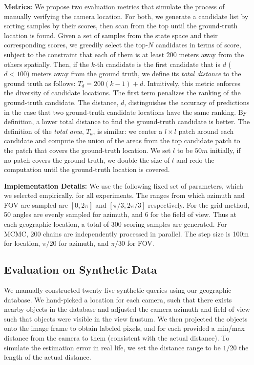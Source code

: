 \noindent
\textbf{Metrics:}
We propose two evaluation metrics that simulate the process of
manually verifying the camera location. For both, we generate a
candidate list by sorting samples by their scores, then scan from the
top until the ground-truth location is found.
Given a set of samples from the state space and
their corresponding scores, we greedily select the top-$N$ candidates
in terms of score, subject to the constraint that each of them is at
least 200 meters away from the others spatially. Then, if the $k$-th
candidate is the first candidate that is $d$ ($d < 100$) meters away
from the ground truth, we define its {\em total distance} to the ground
truth as follows: $T_d = 200(k-1) + d$.
Intuitively, this metric enforces the diversity of candidate
locations. The first term penalizes the ranking
of the ground-truth candidate. The distance, $d$, distinguishes the
accuracy of predictions in the case that two ground-truth candidate
locations have the same ranking. By definition, a lower total distance
to find the ground-truth candidate is better.
The definition of the {\em total area}, $T_a$, is similar: we center a
$l \times l$ patch around each candidate and compute the union of the
areas from the top candidate patch to the patch that covers the
ground-truth location. We set $l$ to be $50m$ initially, if no patch
covers the ground truth, we double the size of $l$ and redo the
computation until the ground-truth location is covered.

\noindent
\textbf{Implementation Details:}
We use the following fixed set of parameters, which we selected
empirically, for all experiments. The ranges from which azimuth and
FOV are sampled are $[0, 2\pi]$ and $[\pi/3, 2\pi/3]$
respectively. For the grid method, 50 angles are evenly sampled for
azimuth, and 6 for the field of view. Thus at each geographic
location, a total of $300$ scoring samples are generated. For MCMC, 200
chains are independently processed in parallel. The step size is 100m
for location, $\pi/20$ for azimuth, and $\pi/30$ for FOV.
  
\subsection{Evaluation on Synthetic Data}
\label{sec:quantitative}
We manually constructed twenty-five synthetic queries using our
geographic database. We hand-picked a location for each camera, such
that there exists nearby objects in the database and adjusted the
camera azimuth and field of view such that objects were visible in the
view frustum. We then projected the objects onto the image frame to
obtain labeled pixels, and for each provided a min/max distance from
the camera to them (consistent with the actual distance). To simulate
the estimation error in real life, we set the distance range to be
$1/20$ the length of the actual distance.

